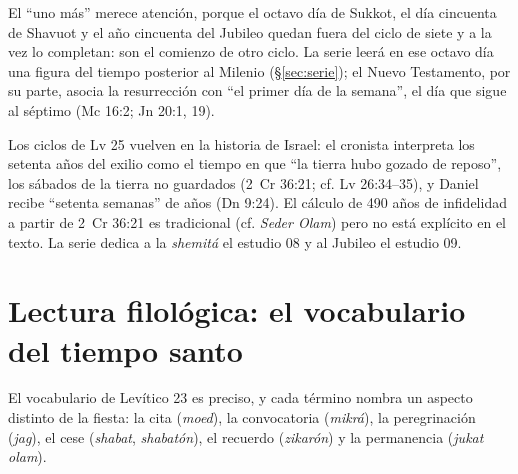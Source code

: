 \documentclass[11pt,letterpaper]{article}
\begin{document}
El ``uno más'' merece atención, porque el octavo día de Sukkot, el día cincuenta de Shavuot y el año cincuenta del Jubileo quedan fuera del ciclo de siete y a la vez lo completan: son el comienzo de otro ciclo. La serie leerá en ese octavo día una figura del tiempo posterior al Milenio (§\ref{sec:serie}); el Nuevo Testamento, por su parte, asocia la resurrección con ``el primer día de la semana'', el día que sigue al séptimo (Mc 16:2; Jn 20:1, 19).

\begin{nota}[Precisión]
Los ciclos de Lv 25 vuelven en la historia de Israel: el cronista interpreta los setenta años del exilio como el tiempo en que ``la tierra hubo gozado de reposo'', los sábados de la tierra no guardados (2~Cr 36:21; cf. Lv 26:34--35), y Daniel recibe ``setenta semanas'' de años (Dn 9:24). El cálculo de 490 años de infidelidad a partir de 2~Cr 36:21 es tradicional (cf. \emph{Seder Olam}) pero no está explícito en el texto. La serie dedica a la \emph{shemitá} el estudio 08 y al Jubileo el estudio 09.
\end{nota}

\section{Lectura filológica: el vocabulario del tiempo santo}\label{sec:filologia}

El vocabulario de Levítico 23 es preciso, y cada término nombra un aspecto distinto de la fiesta: la cita (\emph{moed}), la convocatoria (\emph{mikrá}), la peregrinación (\emph{jag}), el cese (\emph{shabat}, \emph{shabatón}), el recuerdo (\emph{zikarón}) y la permanencia (\emph{jukat olam}).
\end{document}
